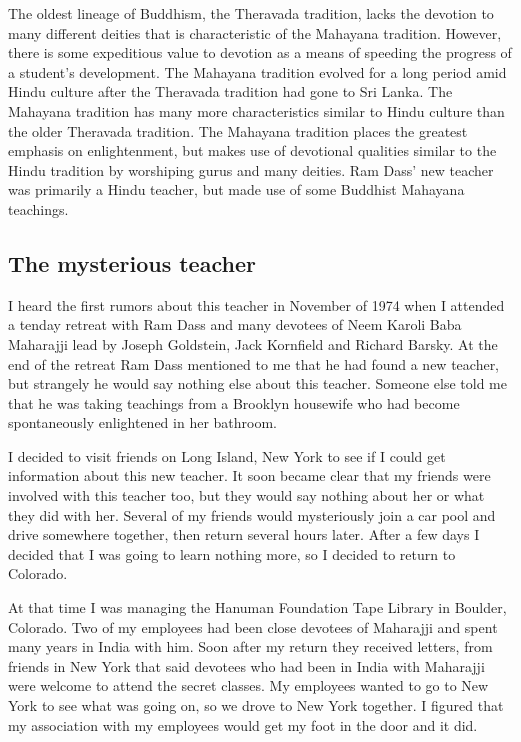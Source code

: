 \documentclass[a5paper,10pt,english]{book}
\begin{document}
\sphinxAtStartPar
The oldest lineage of Buddhism, the Theravada tradition, lacks the
devotion to many different deities that is characteristic of the
Mahayana tradition. However, there is some expeditious value to devotion
as a means of speeding the progress of a student’s development. The
Mahayana tradition evolved for a long period amid Hindu culture after
the Theravada tradition had gone to Sri Lanka. The Mahayana tradition
has many more characteristics similar to Hindu culture than the older
Theravada tradition. The Mahayana tradition places the greatest emphasis
on enlightenment, but makes use of devotional qualities similar to the
Hindu tradition by worshiping gurus and many deities. Ram Dass’ new
teacher was primarily a Hindu teacher, but made use of some Buddhist
Mahayana teachings.


\subsection{The mysterious teacher}
\label{\detokenize{psychopaths:the-mysterious-teacher}}
\sphinxAtStartPar
I heard the first rumors about this teacher in November of 1974 when I
attended a ten\sphinxhyphen{}day  retreat with Ram Dass and many devotees
of Neem Karoli Baba Maharajji lead by Joseph Goldstein, Jack Kornfield
and Richard Barsky. At the end of the retreat Ram Dass mentioned to me
that he had found a new teacher, but strangely he would say nothing else
about this teacher. Someone else told me that he was taking teachings
from a Brooklyn housewife who had become spontaneously enlightened in
her bathroom.

\sphinxAtStartPar
I decided to visit friends on Long Island, New York to see if I could
get information about this new teacher. It soon became clear that my
friends were involved with this teacher too, but they would say nothing
about her or what they did with her. Several of my friends would
mysteriously join a car pool and drive somewhere together, then return
several hours later. After a few days I decided that I was going to
learn nothing more, so I decided to return to Colorado.

\sphinxAtStartPar
At that time I was managing the Hanuman Foundation Tape Library in
Boulder, Colorado. Two of my employees had been close devotees of
Maharajji and spent many years in India with him. Soon after my return
they received letters, from friends in New York that said devotees who
had been in India with Maharajji were welcome to attend the secret
classes. My employees wanted to go to New York to see what was going on,
so we drove to New York together. I figured that my association with my
employees would get my foot in the door and it did.
\end{document}
